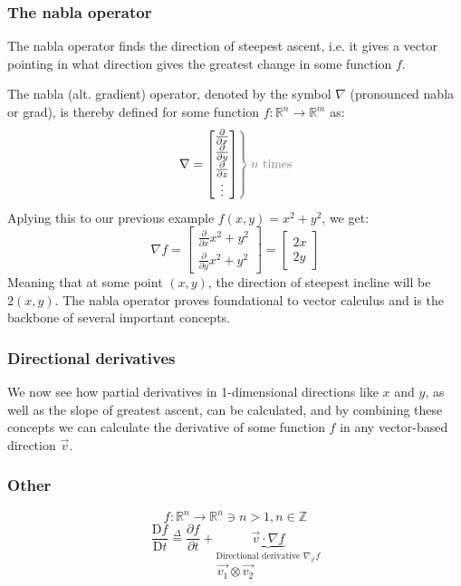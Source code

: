 \documentclass[a4paper, 12pt]{article} %
\newcommand{\definedas}{\stackrel{\Delta}{=}} %
\newcommand{\partialder}[2]{\frac{\partial #1}{\partial #2}} %
\newcommand{\materialder}[2]{\frac{\mathrm{D} #1}{\mathrm{D} #2}} %
\begin{document}
\subsubsection{The nabla operator}
The nabla operator finds the direction of steepest ascent, i.e. it gives a vector pointing in what direction gives the greatest change in some function $f$.

The nabla (alt. gradient) operator, denoted by the symbol $\nabla$ (pronounced nabla or grad), is thereby defined for some function $f:\mathbb{R}^n\rightarrow\mathbb{R}^m$ as:
\begin{equation}
	\left.\nabla=
	\begin{bmatrix}
		\partialder{}{x} \\
		\partialder{}{y} \\
		\partialder{}{z} \\ 
		\vdots 	         \\
	\end{bmatrix}
	\color{gray}\right\} \color{gray}n\text{ times}\color{black}
\end{equation}
Aplying this to our previous example $f(x,y)=x^2+y^2$, we get:
$$\nabla f=\begin{bmatrix}
	\partialder{}{x}x^2+y^2\\
	\partialder{}{y}x^2+y^2	
\end{bmatrix}=\begin{bmatrix}
	2x\\
	2y
\end{bmatrix}$$
Meaning that at some point $(x,y)$, the direction of steepest incline will be $2(x,y)$. The nabla operator proves foundational to vector calculus and is the backbone of several important concepts.

\subsubsection{Directional derivatives}
We now see how partial derivatives in 1-dimensional directions like $x$ and $y$, as well as the slope of greatest ascent, can be calculated, and by combining these concepts we can calculate the derivative of some function $f$ in any vector-based direction $\vec{v}$.
\subsubsection{Other}
$$f:\mathbb{R}^n\rightarrow\mathbb{R}^n\ni n>1,n\in\mathbb{Z}$$
\begin{equation}
	\materialder{f}{t}\definedas\partialder{f}{t}+\underbrace{\vec{v}\cdot\nabla f}_{\text{Directional derivative }\nabla_{\vec{v}}f}
\end{equation}
$$\vec{v_1}\otimes\vec{v_2}$$
\end{document}
